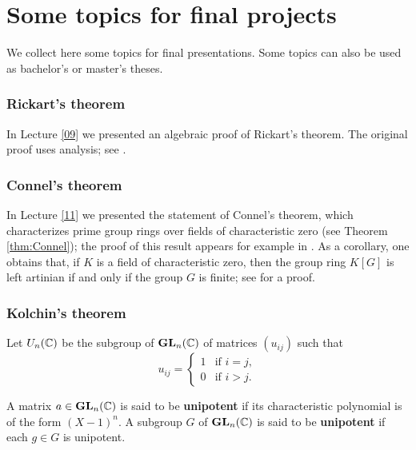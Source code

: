 \chapter*{Some topics for final projects}

\pagestyle{plain}
\fancyhf{}
\fancyfoot[CE,CO]{\leftmark}
\fancyfoot[LE,RO]{\thepage}


We collect here some topics for final presentations. Some topics
can also be used as bachelor's or master's theses. 

\subsection*{Rickart's theorem}

In Lecture \ref{09} we presented an algebraic proof of Rickart's theorem. 
The original proof uses analysis; see \cite[(6.4) of Chapter II]{MR1838439}. 

\subsection*{Connel's theorem}

In Lecture \ref{11} we presented the statement of Connel's theorem, which
characterizes prime group rings over fields of characteristic zero 
(see Theorem \ref{thm:Connel}); the proof of this  
result appears for example in \cite[Theorem 2.10 of Chapter 4]{MR798076}. 
As a corollary, one obtains 
that, if $K$ is a field of characteristic zero,
then the group ring $K[G]$ is left artinian if and only if the group
$G$ is finite; see 
\cite[Theorem 1.1 of Chapter 10]{MR798076} for a proof. 

\subsection*{Kolchin's theorem}

Let $U_n(\mathbb{C})$ be the subgroup of $\mathbf{GL}_n(\mathbb{C})$ 
of matrices $(u_{ij})$ such that 
\[
u_{ij}=\begin{cases}
1&\text{if $i=j$},\\
0&\text{if $i>j$}.\end{cases}
\]

A matrix $a\in\mathbf{GL}_n(\mathbb{C})$ is said to be \textbf{unipotent} 
if its characteristic polynomial is of the form $(X-1)^n$. 
A subgroup $G$ of $\mathbf{GL}_n(\mathbb{C})$ is said to be \textbf{unipotent} if
each $g\in G$ is unipotent. 

